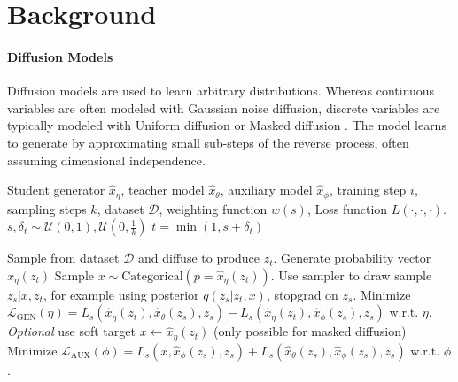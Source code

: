 \section{Background}
\label{sec:background}

\paragraph{Diffusion Models}
Diffusion models are used to learn arbitrary distributions. Whereas continuous variables are often modeled with Gaussian noise diffusion, discrete variables are typically modeled with Uniform diffusion \citep{hoogeboom2021argmaxflows} or Masked diffusion \citep{austin2021structured}. The model learns to generate by approximating small sub-steps of the reverse process, often assuming dimensional independence.

\begin{algorithm}[t]
\begin{algorithmic}
\Require Student generator $\hat{x}_\eta$, teacher model $\hat{x}_\theta$, auxiliary model $\hat{x}_\phi$, training step $i$, sampling steps $k$, dataset $\mathcal{D}$, weighting function $w(s)$, Loss function $L(\cdot, \cdot, \cdot)$.
\State $s, \delta_t\sim\mathcal{U}(0, 1), \mathcal{U}(0, \tfrac{1}{k})$
\State $t=\min(1, s+\delta_t)$

\State Sample from dataset $\mathcal{D}$ and diffuse to produce $z_t$.
\State Generate probability vector $\hat{x}_\eta(z_{t})$
\State Sample $x \sim \mathrm{Categorical}(p=\hat{x}_\eta(z_{t}))$.
\State Use sampler to draw sample $z_{s} | x, z_t$, for example using posterior $q(z_s|z_{t}, x)$, stopgrad on $z_{s}$.
\State Minimize $\mathcal{L}_{\text{GEN}}(\eta) = L_s(\hat{x}_\eta(z_{t}), \hat{x}_\theta(z_s), z_s) - L_s(\hat{x}_\eta(z_{t}), \hat{x}_\phi(z_s), z_s) \text{ w.r.t. } \eta$.
\Else
  \State \textit{Optional} use soft target $x \leftarrow \hat{x}_\eta(z_t)$ (only possible for masked diffusion)
  \State Minimize $\mathcal{L}_\mathrm{AUX}(\phi) =  L_s(x, \hat{x}_\phi(z_s), z_s) + L_s(\hat{x}_{\theta}(z_s), \hat{x}_\phi(z_s), z_s)  \text{ w.r.t. } \phi$.
\EndIf
\caption{Discrete MMD Training}
\label{alg:mmd}
\end{algorithmic}
\end{algorithm}

